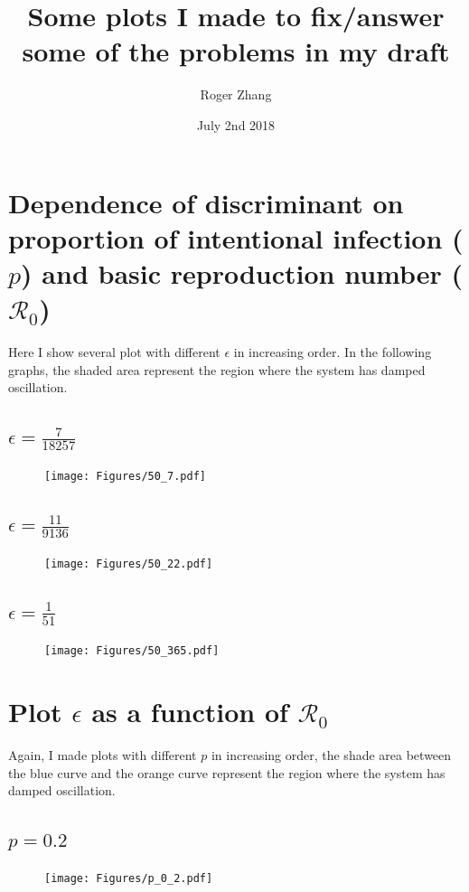 \documentclass[12pt]{article}
\title{Some plots I made to fix/answer some of the problems in my draft}
\author{Roger Zhang}
\date{July 2nd 2018}
\newcommand{\R}{\mathcal{R}}
\begin{document}
\maketitle
\clearpage
\section{Dependence of discriminant on proportion of intentional infection ($p$) and basic reproduction number ($\R_0$)}

Here I show several plot with different $\epsilon$ in increasing order. In the following graphs, the shaded area represent the region where the system has damped oscillation.
\subsection{$\epsilon=\frac{7}{18257}$}
\begin{figure}[H]
  \caption{}
  \centering
  \texttt{[image: Figures/50\_7.pdf]}
\end{figure}

\subsection{$\epsilon=\frac{11}{9136}$}
\begin{figure}[H]
  \caption{}
  \centering
  \texttt{[image: Figures/50\_22.pdf]}
\end{figure}

  \subsection{$\epsilon=\frac{1}{51}$}
\begin{figure}[H]
  \caption{}
  \centering
  \texttt{[image: Figures/50\_365.pdf]}
\end{figure}
\clearpage

\section{Plot $\epsilon$ as a function of $\R_0$}

Again, I made plots with different $p$ in increasing order, the shade area between the blue curve and the orange curve represent the region where the system has damped oscillation.
\subsection{$p=0.2$}
\begin{figure}[H]
  \caption{}
  \centering
  \texttt{[image: Figures/p\_0\_2.pdf]}
\end{figure}
\end{document}

